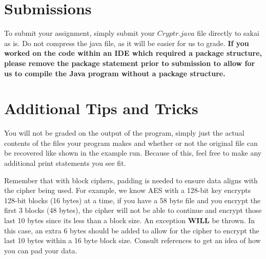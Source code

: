 \documentclass{article}
\begin{document}
\section*{Submissions}
To submit your assignment, simply submit your $Cryptr.java$ file directly to sakai as is. Do not compress the java file, as it will be easier for us to grade. \textbf{If you worked on the code within an IDE which required a package structure, please remove the package statement prior to submission to allow for us to compile the Java program without a package structure.}

\section*{Additional Tips and Tricks}

\begin{info}
You will not be graded on the output of the program, simply just the actual contents of the files your program makes and whether or not the original file can be recovered like shown in the example run. Because of this, feel free to make any additional print statements you see fit. 
\end{info}

\begin{info} 
Remember that with block ciphers, padding is needed to ensure data aligns with the cipher being used. For example, we know AES with a 128-bit key encrypts 128-bit blocks (16 bytes) at a time, if you have a 58 byte file and you encrypt the first 3 blocks (48 bytes), the cipher will not be able to continue and encrypt those last 10 bytes since its less than a block size. An exception \textbf{WILL} be thrown. In this case, an extra 6 bytes should be added to allow for the cipher to encrypt the last 10 bytes within a 16 byte block size. Consult references to get an idea of how you can pad your data.
\end{info}
\end{document}
